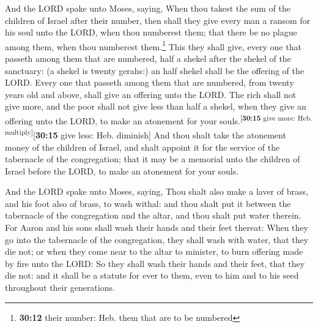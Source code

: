  And the LORD spake unto Moses, saying, 
When thou takest the sum of the children of Israel after their number,
then shall they give every man a ransom for his soul unto the LORD, when
thou numberest them; that there be no plague among them, when thou
numberest them.\footnote{\textbf{30:12} their number: Heb. them that are
  to be numbered}  This they shall give, every one that
passeth among them that are numbered, half a shekel after the shekel of
the sanctuary: (a shekel is twenty gerahs:) an half shekel shall be the
offering of the LORD.  Every one that passeth among them
that are numbered, from twenty years old and above, shall give an
offering unto the LORD.  The rich shall not give more,
and the poor shall not give less than half a shekel, when they give an
offering unto the LORD, to make an atonement for your
souls.\textsuperscript{{[}\textbf{30:15} give more: Heb.
multiply{]}}{[}\textbf{30:15} give less: Heb. diminish{]}
 And thou shalt take the atonement money of the children
of Israel, and shalt appoint it for the service of the tabernacle of the
congregation; that it may be a memorial unto the children of Israel
before the LORD, to make an atonement for your souls.

 And the LORD spake unto Moses, saying, 
Thou shalt also make a laver of brass, and his foot also of brass, to
wash withal: and thou shalt put it between the tabernacle of the
congregation and the altar, and thou shalt put water therein.
 For Aaron and his sons shall wash their hands and their
feet thereat:  When they go into the tabernacle of the
congregation, they shall wash with water, that they die not; or when
they come near to the altar to minister, to burn offering made by fire
unto the LORD:  So they shall wash their hands and their
feet, that they die not: and it shall be a statute for ever to them,
even to him and to his seed throughout their generations.

